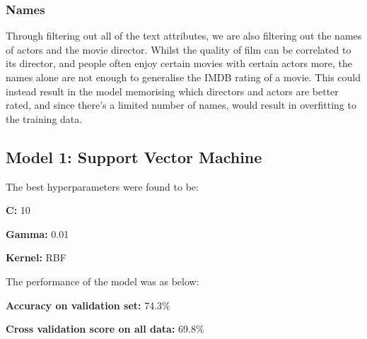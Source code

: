\subsubsection{Names}
Through filtering out all of the text attributes, we are also filtering out the names of actors and the movie director. Whilst the quality of film can be correlated to its director, and people often enjoy certain movies with certain actors more, the names alone are not enough to generalise the IMDB rating of a movie. This could instead result in the model memorising which directors and actors are better rated, and since there's a limited number of names, would result in overfitting to the training data.


\subsection{Model 1: Support Vector Machine}
The best hyperparameters were found to be:

\textbf{C: } 10

\textbf{Gamma: } 0.01

\textbf{Kernel: } RBF

\noindent
The performance of the model was as below:

\noindent
\textbf{Accuracy on validation set:} 74.3\%

\noindent
\textbf{Cross validation score on all data:} 69.8\%  


